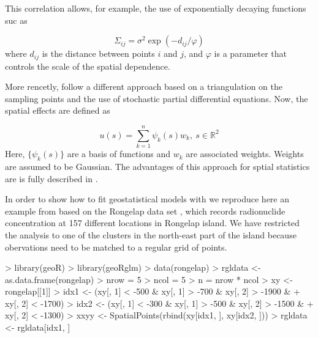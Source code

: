 \documentclass[article]{jss}
\begin{document}
This correlation allows, for example, the use of exponentially decaying
functions suc as 

$$
\Sigma_{ij} = \sigma^2 \exp(-d_{ij}/\varphi)
$$
\noindent
where $d_{ij}$ is the distance between points $i$ and $j$, and $\varphi$
is a parameter that controls the scale of the spatial dependence.


%
%
%



More rencetly, \citet{Lindgren:2011} follow a different approach based on
a triangulation on the sampling points and the use of stochastic partial
differential equations. Now, the spatial effects are defined as

$$
u(s)=\sum_{k=1}^n \psi_k(s)w_k,\ s\in \mathbb{R}^2
$$
\noindent
Here, $\{\psi_k(s)\}$ are a basis of functions and $w_k$ are associated
weights. Weights are assumed to be Gaussian. The advantages of this approach
for sptial statistics are is fully described in \citet{Camelettietal:2011}.


In order to show how to fit geostatistical models with  we
reproduce here an example from \citet{GomezRubioetal:2013} based on the
Rongelap data set \citep{DiggleRibeiro:2007}, which records  radionuclide
concentration at 157 different locations in Rongelap island. We have restricted
the analysis to one of the clusters in the north-east part of the island
because obervations need to be matched to a regular grid of points.

\begin{Schunk}
\begin{Sinput}
> library(geoR)
> library(geoRglm)
> data(rongelap)
> rgldata <- as.data.frame(rongelap)
> nrow = 5
> ncol = 5
> n = nrow * ncol
> xy <- rongelap[[1]]
> idx1 <- (xy[, 1] < -500 & xy[, 1] > -700 & xy[, 2] > -1900 & 
+     xy[, 2] < -1700)
> idx2 <- (xy[, 1] < -300 & xy[, 1] > -500 & xy[, 2] > -1500 & 
+     xy[, 2] < -1300)
> xxyy <- SpatialPoints(rbind(xy[idx1, ], xy[idx2, ]))
> rgldata <- rgldata[idx1, ]
\end{Sinput}
\end{Schunk}
\end{document}
